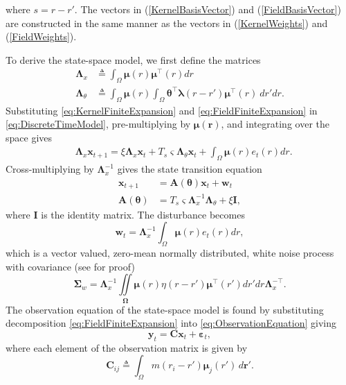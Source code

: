 \documentclass[journal]{IEEEtran}
\begin{document}
where $s=r-r'$. The vectors in  (\ref{KernelBasisVector}) and (\ref{FieldBasisVector}) are constructed in the same manner as the vectors in  (\ref{KernelWeights}) and (\ref{FieldWeights}). 
 
To derive the state-space model, we first define the matrices 
\begin{align}\label{eq:Lambdax}
 \mathbf{\Lambda}_{x} &\triangleq \int_{\Omega}\boldsymbol\mu\left(r\right)\boldsymbol\mu^\top\left(r\right) dr \\
\label{eq:Lambdatheta}
 \mathbf{\Lambda}_{\theta} &\triangleq \int_{\Omega}\boldsymbol\mu\left(r\right) \int_\Omega { 
	   \boldsymbol\theta^\top\boldsymbol\lambda\left(r-r'\right)
	    \boldsymbol\mu^\top\left(r\right)\ dr'dr.}
\end{align}
Substituting \eqref{eq:KernelFiniteExpansion} and \eqref{eq:FieldFiniteExpansion} in \eqref{eq:DiscreteTimeModel}, pre-multiplying by $\boldsymbol\mu\left(\mathbf r\right)$, and integrating over the space gives
\begin{align}\label{eq:DecomposedModel2} 
	&\mathbf{\Lambda}_{x} \mathbf{x}_{t+1}= 
	\xi\mathbf{\Lambda}_{x} \mathbf{x}_t +T_s \varsigma \mathbf{\Lambda}_{\theta}\mathbf{x}_t +\int_{\Omega}\boldsymbol\mu\left(r\right)e_t\left(r\right)dr.
\end{align}
Cross-multiplying by $\mathbf{\Lambda}_{x}^{-1}$ gives the state transition equation
\begin{align}\label{eq:StateEquation}
 \mathbf x_{t+1} &=\mathbf A(\boldsymbol \theta) \mathbf x_t+ \mathbf w_t\\
\label{eq:A_theta}
 \mathbf A(\boldsymbol \theta) &= T_s\varsigma\mathbf{\Lambda}_{x}^{-1}\mathbf{\Lambda}_{\theta}+\xi\mathbf I,
\end{align}
where $\mathbf I$ is the identity matrix. The disturbance becomes 
\begin{equation}\label{eq:Disturbance}
\mathbf w_t= \mathbf{\Lambda}_{x}^{-1}\int_{\Omega}\boldsymbol\mu \left(r\right)e_t\left(r\right)dr,
\end{equation}
which is a vector valued, zero-mean normally distributed, white noise process with covariance (see \cite{Freestone2011} for proof)
\begin{equation}
\boldsymbol\Sigma_w =\mathbf{\Lambda}_{x}^{-1}\iint\limits_{\boldsymbol\Omega}\boldsymbol\mu\left(r\right) \eta\left(r-r'\right)\boldsymbol\mu^{\top}\left(r'\right)dr'dr\mathbf{\Lambda}_{x}^{-\top}.
\end{equation}
The observation equation of the state-space model is found by substituting decomposition \eqref{eq:FieldFiniteExpansion}
 into \eqref{eq:ObservationEquation} giving
\begin{equation}\label{eq:ReducedObservationEquation} 
	\mathbf{y}_t = \mathbf{C}\mathbf{x}_t + \boldsymbol{\varepsilon}_t,
\end{equation}
where each element of the observation matrix is given by
\begin{equation}\label{eq:Observationmatrix}
	\mathbf{C}_{ij} \triangleq \int_{\Omega}m(r_i - r')\boldsymbol{\mu}_j(r') \, d\mathbf{r}'.
\end{equation}
\end{document}
